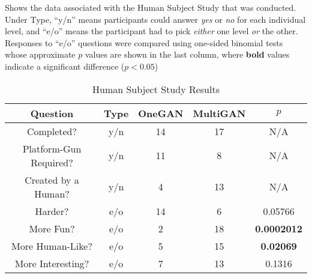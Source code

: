 \begin{table}[t!]
\caption{\label{tab:subjectStudyData} Human Subject Study Results}
{\small Shows the data associated with the Human Subject Study that was conducted. Under Type, ``y/n'' means participants could answer \emph{yes} or \emph{no} for each individual level, and ``e/o'' means the participant had to pick \emph{either} one level \emph{or} the other. Responses to ``e/o'' questions were compared using one-sided binomial tests whose approximate $p$ values are shown in the last column, where \textbf{bold} values indicate a significant difference ($p < 0.05$)} \\
\centering
\begin{tabular}{|c|c|c|c|c|}
\hline
Question & Type & OneGAN & MultiGAN & $p$ \\ 
\hline 
\hline
Completed? & y/n & 14 & 17 & N/A \\
\hline
Platform-Gun Required? & y/n & 11 & 8 & N/A  \\
\hline
Created by a Human? & y/n & 4 & 13 & N/A \\
\hline
\hline
Harder? & e/o & 14 & 6 & 0.05766 \\
\hline
More Fun? & e/o & 2 & 18 & \textbf{0.0002012} \\
\hline
More Human-Like? & e/o & 5 & 15 & \textbf{0.02069}\\
\hline
More Interesting? & e/o & 7 & 13 & 0.1316\\
\hline


\end{tabular}
\end{table}



